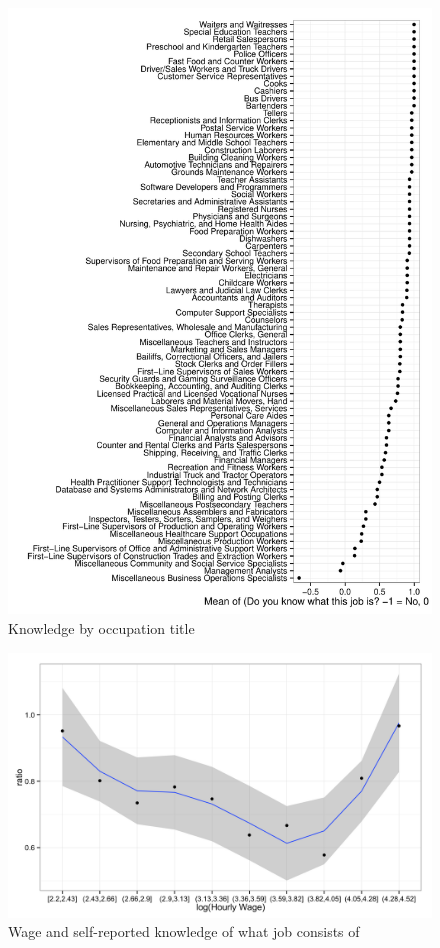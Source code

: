 \documentclass[11pt]{article}
\begin{document}
\begin{figure}
\caption{Knowledge by occupation title} 
\centering
\begin{minipage}{0.85 \linewidth}
\includegraphics[width = \linewidth]{./plots/knowledge_by_occupation.pdf}
\end{minipage}  
\end{figure} 

\begin{figure}
\caption{Wage and self-reported knowledge of what job consists of} 
\centering
\begin{minipage}{0.85 \linewidth}
\includegraphics[width = \linewidth]{./plots/knowledge_wage.png}
\end{minipage}  
\end{figure} 
\end{document}
